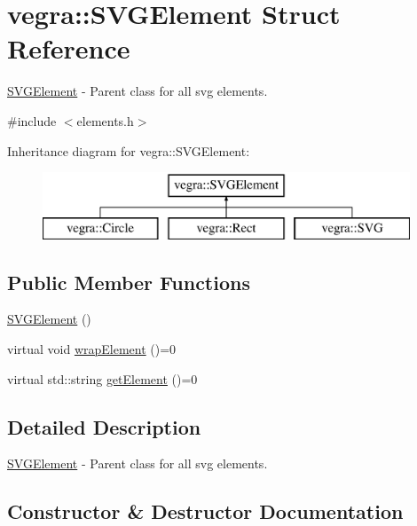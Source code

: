 \hypertarget{structvegra_1_1SVGElement}{}\section{vegra\+:\+:S\+V\+G\+Element Struct Reference}
\label{structvegra_1_1SVGElement}


\mbox{\hyperlink{structvegra_1_1SVGElement}{S\+V\+G\+Element}} -\/ Parent class for all svg elements.  




{\ttfamily \#include $<$elements.\+h$>$}

Inheritance diagram for vegra\+:\+:S\+V\+G\+Element\+:\begin{figure}[H]
\begin{center}
\leavevmode
\includegraphics[height=2.000000cm]{structvegra_1_1SVGElement}
\end{center}
\end{figure}
\subsection*{Public Member Functions}
\begin{DoxyCompactItemize}
\item 
\mbox{\hyperlink{structvegra_1_1SVGElement_a08b7a1eb40780c9aec388ebd3f715e19}{S\+V\+G\+Element}} ()
\item 
virtual void \mbox{\hyperlink{structvegra_1_1SVGElement_a1369400ebe57287f1b5beb5f0234d8d7}{wrap\+Element}} ()=0
\item 
virtual std\+::string \mbox{\hyperlink{structvegra_1_1SVGElement_a17fa30b9de97e1541eaa1f6888145de2}{get\+Element}} ()=0
\end{DoxyCompactItemize}


\subsection{Detailed Description}
\mbox{\hyperlink{structvegra_1_1SVGElement}{S\+V\+G\+Element}} -\/ Parent class for all svg elements. 

\subsection{Constructor \& Destructor Documentation}
\mbox{\label{structvegra_1_1SVGElement_a08b7a1eb40780c9aec388ebd3f715e19}} 
